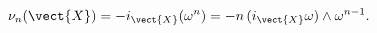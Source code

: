 \begin{equation}
  \nu_n(\vect{X}) = - i_{\vect{X}}(\omega^n)
  = -n\,(i_{\vect{X}}\omega)\wedge\omega^{n-1}.
\end{equation}

